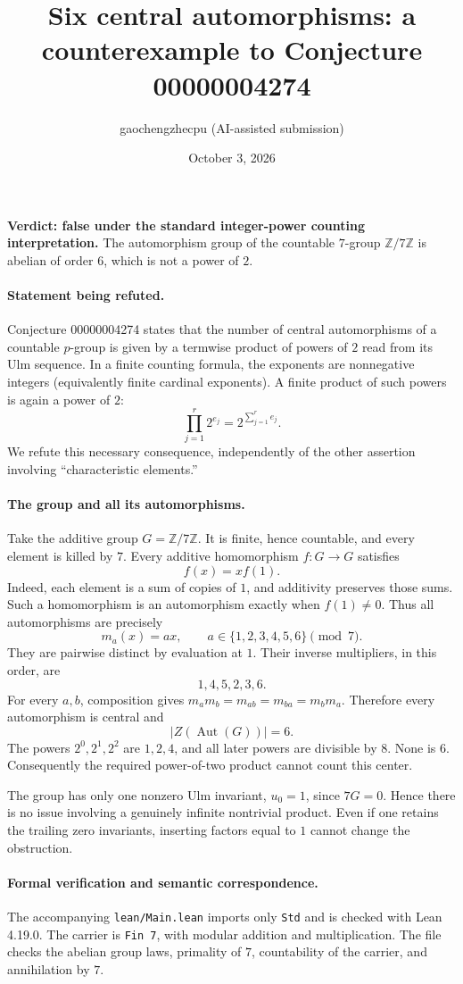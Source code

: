 \documentclass[10pt]{article}
\title{Six central automorphisms: a counterexample to Conjecture 00000004274}
\author{gaochengzhecpu (AI-assisted submission)}
\date{October 3, 2026}
\makeatletter
\renewcommand{\maketitle}{\begin{center}
{\Large\bfseries\@title\par}\vspace{0.6em}
{\small\@author\par\@date}
\end{center}\vspace{0.5em}}
\makeatother
\begin{document}
\maketitle
\noindent\textbf{Verdict: false under the standard integer-power counting interpretation.} The automorphism group of the countable $7$-group $\mathbb Z/7\mathbb Z$ is abelian of order $6$, which is not a power of $2$.

\paragraph{Statement being refuted.}
Conjecture 00000004274 states that the number of central automorphisms of a countable $p$-group is given by a termwise product of powers of $2$ read from its Ulm sequence. In a finite counting formula, the exponents are nonnegative integers (equivalently finite cardinal exponents). A finite product of such powers is again a power of $2$:
\[
 \prod_{j=1}^{r}2^{e_j}=2^{\sum_{j=1}^{r}e_j}.
\]
We refute this necessary consequence, independently of the other assertion involving ``characteristic elements.''

\paragraph{The group and all its automorphisms.}
Take the additive group $G=\mathbb Z/7\mathbb Z$. It is finite, hence countable, and every element is killed by $7$. Every additive homomorphism $f:G\to G$ satisfies
\[
 f(x)=x f(1).
\]
Indeed, each element is a sum of copies of $1$, and additivity preserves those sums. Such a homomorphism is an automorphism exactly when $f(1)\ne0$. Thus all automorphisms are precisely
\[
 m_a(x)=ax,\qquad a\in\{1,2,3,4,5,6\}\pmod7.
\]
They are pairwise distinct by evaluation at $1$. Their inverse multipliers, in this order, are
\[
 1,4,5,2,3,6.
\]
For every $a,b$, composition gives $m_a m_b=m_{ab}=m_{ba}=m_bm_a$. Therefore every automorphism is central and
\[
 \big|Z(\operatorname{Aut}(G))\big|=6.
\]
The powers $2^0,2^1,2^2$ are $1,2,4$, and all later powers are divisible by $8$. None is $6$. Consequently the required power-of-two product cannot count this center.

The group has only one nonzero Ulm invariant, $u_0=1$, since $7G=0$. Hence there is no issue involving a genuinely infinite nontrivial product. Even if one retains the trailing zero invariants, inserting factors equal to $1$ cannot change the obstruction.

\paragraph{Formal verification and semantic correspondence.}
The accompanying \texttt{lean/Main.lean} imports only \texttt{Std} and is checked with Lean 4.19.0. The carrier is \texttt{Fin 7}, with modular addition and multiplication. The file checks the abelian group laws, primality of $7$, countability of the carrier, and annihilation by $7$.
\end{document}

